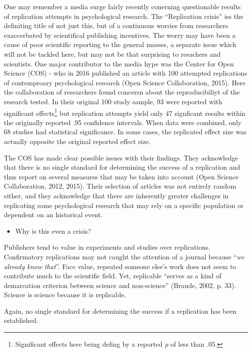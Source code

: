 \documentclass[man]{apa6}
\providecommand{\tightlist}{%
  \setlength{\itemsep}{0pt}\setlength{\parskip}{0pt}}
\let\rmarkdownfootnote\footnote%
\def\footnote{\protect\rmarkdownfootnote}
\theoremstyle{definition}
\theoremstyle{definition}
\theoremstyle{definition}
\theoremstyle{remark}
\begin{document}
One may remember a media surge fairly recently conerning questionable
results of replication attempts in psychological research. The
\enquote{Replication crisis} iss the definiting title of not just this,
but of a continuous worries from researchers exaccerbated by
scientifical publishing incentives. The worry may have been a cause of
poor scientific reporting to the general masses, a separate issue which
will not be tackled here, but may not be that surprising to resachers
and scientists. One major contributor to the media hype was the Center
for Open Science (COS) - who in 2016 published an article with 100
attempted replications of contemproary psychological research (Open
Science Collaboration, 2015). Here the collaboration of researchers
found concersn about the reproducibiliyt of the research tested. In
their original 100 study sample, 93 were reported with significant
effects\footnote{Significant effects here being defing by a reported
  \emph{p} of less than .05.} but replication attempts yield only 47
signficant results within the originally reported .95 confidence
intervals. When data were combined, only 68 studies had statistical
significance. In some cases, the replicated effect size was actually
opposite the original reported effect size.

The COS has made clear possible issues with their findings. They
acknowledge that there is no single standard for determining the success
of a replication and thus report on several measures that may be taken
into account (Open Science Collaboration, 2012, 2015). Their selection
of articles was not entirely random either, and they acknowledge that
there are inherently greater challenges in replicating some
psychological research that may rely on a specific population or
dependent on an historical event.

\begin{itemize}
\tightlist
\item
  Why is this even a crisis?
\end{itemize}

Publishers tend to value in experiments and studies over replications.
Confirmatory replications may not caught the attention of a journal
because \enquote{\emph{we already know that}}. Face value, repeated
someone else's work does not seem to contribute much to the scientific
field. Yet, replicable \enquote{serves as a kind of demarcation
criterion between science and non-science} (Braude, 2002, p. 33).
Science is science because it is replicable.

Again, no single standard for determining the success if a replication
has been established.
\end{document}
